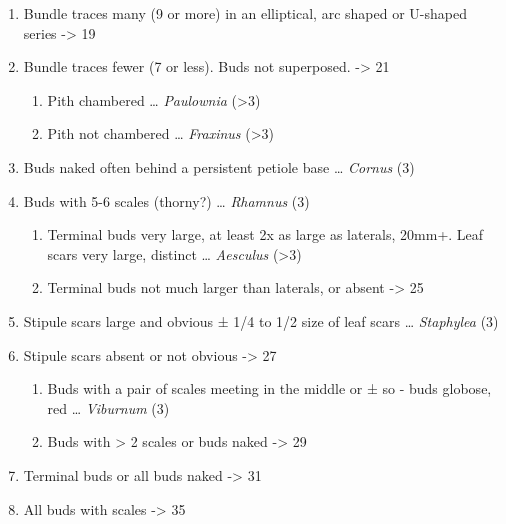 \documentclass[openany]{book}
\providecommand{\tightlist}{%
  \setlength{\itemsep}{0pt}\setlength{\parskip}{0pt}}
\begin{document}
\begin{enumerate}
\def\labelenumi{\arabic{enumi}.}
\setcounter{enumi}{16}
\item
  Bundle traces many (9 or more) in an elliptical, arc shaped or
  U-shaped series -\textgreater{} 19
\item
  Bundle traces fewer (7 or less). Buds not superposed. -\textgreater{}
  21

  \begin{enumerate}
  \def\labelenumii{\arabic{enumii}.}
  \setcounter{enumii}{18}
  \tightlist
  \item
    Pith chambered \ldots{} \emph{Paulownia} (\textgreater{}3)
  \item
    Pith not chambered \ldots{} \emph{Fraxinus} (\textgreater{}3)
  \end{enumerate}
\item
  Buds naked often behind a persistent petiole base \ldots{}
  \emph{Cornus} (3)
\item
  Buds with 5-6 scales (thorny?) \ldots{} \emph{Rhamnus} (3)

  \begin{enumerate}
  \def\labelenumii{\arabic{enumii}.}
  \setcounter{enumii}{22}
  \tightlist
  \item
    Terminal buds very large, at least 2x as large as laterals, 20mm+.
    Leaf scars very large, distinct \ldots{} \emph{Aesculus}
    (\textgreater{}3)
  \item
    Terminal buds not much larger than laterals, or absent
    -\textgreater{} 25
  \end{enumerate}
\item
  Stipule scars large and obvious ± 1/4 to 1/2 size of leaf scars
  \ldots{} \emph{Staphylea} (3)
\item
  Stipule scars absent or not obvious -\textgreater{} 27

  \begin{enumerate}
  \def\labelenumii{\arabic{enumii}.}
  \setcounter{enumii}{26}
  \tightlist
  \item
    Buds with a pair of scales meeting in the middle or ± so - buds
    globose, red \ldots{} \emph{Viburnum} (3)
  \item
    Buds with \textgreater{} 2 scales or buds naked -\textgreater{} 29
  \end{enumerate}
\item
  Terminal buds or all buds naked -\textgreater{} 31
\item
  All buds with scales -\textgreater{} 35


\end{enumerate}
\end{document}
